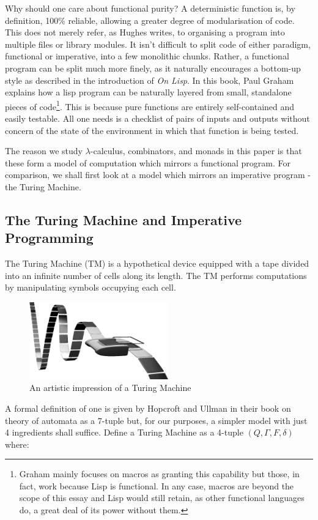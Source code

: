 Why should one care about functional purity? A deterministic function is, by definition, 100\% reliable, allowing a greater degree of modularisation of code\cite{WhyFunctional}. This does not merely refer, as Hughes writes, to organising a program into multiple files or library modules. It isn't difficult to split code of either paradigm, functional or imperative, into a few monolithic chunks.
Rather, a functional program can be split much more finely, as it naturally encourages a bottom-up style as described in the introduction of {\it On Lisp}. In this book, Paul Graham explains how a lisp program can be naturally layered from small, standalone pieces of code\footnote{Graham mainly focuses on macros as granting this capability but those, in fact, work because Lisp is functional. In any case, macros are beyond the scope of this essay and Lisp would still retain, as other functional languages do, a great deal of its power without them.}. This is because pure functions are entirely self-contained and easily testable. All one needs is a checklist of pairs of inputs and outputs without concern of the state of the environment in which that function is being tested.

The reason we study $\lambda$-calculus, combinators, and monads in this paper is that these form a model of computation which mirrors a functional program. For comparison, we shall first look at a model which mirrors an imperative program - the Turing Machine.

\subsection{The Turing Machine and Imperative Programming}
The Turing Machine (TM) is a hypothetical device equipped with a tape divided into an infinite number of cells along its length. The TM performs computations by manipulating symbols occupying each cell.
\begin{figure}[h]
    \centering
    \includegraphics[width=6cm]{turing_machine}
    \caption{An artistic impression of a Turing Machine}
\end{figure}

A formal definition of one is given by Hopcroft and Ullman in their book on theory of automata\cite{IntroToAutomata} as a 7-tuple but, for our purposes, a simpler model with just 4 ingredients shall suffice. Define a Turing Machine as a 4-tuple $(Q, \Gamma, F, \delta)$ where:

